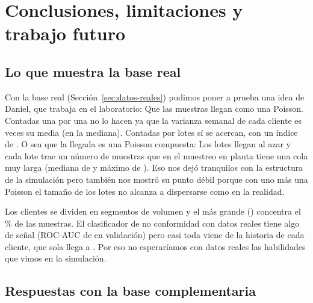 \section{Conclusiones, limitaciones y trabajo futuro}
\label{sec:conclusiones}

\ifdefined\RealMuestras
\subsection{Lo que muestra la base real}

Con la base real (Sección~\ref{sec:datos-reales}) pudimos poner a prueba
una idea de Daniel, que trabaja en el laboratorio: Que las muestras llegan
como una Poisson. Contadas una por una no lo hacen ya que la varianza
semanal de cada cliente es \RealDispMuestrasTodos{} veces su media (en la
mediana). Contadas por lotes sí se acercan, con un índice de
\RealDispLotesTodos{}. O sea que la llegada es una Poisson compuesta: Los
lotes llegan al azar y cada lote trae un número de muestras que en el
muestreo en planta tiene una cola muy larga (mediana de
\RealLoteMedianaPlanta{} y máximo de \RealLoteMaxPlanta{}). Eso nos dejó
tranquilos con la estructura de la simulación pero también nos mostró su
punto débil porque con uno más una Poisson el tamaño de los lotes no
alcanza a dispersarse como en la realidad.

Los clientes se dividen en \RealSegK{} segmentos de volumen y el más grande
(\RealSegMayor{}) concentra el \RealSegMayorMuestrasPct{}\,\% de las
muestras. El clasificador de no conformidad con datos reales tiene algo de
señal (ROC-AUC de \RealRiesgoAUCLogistica{} en validación) pero casi toda
viene de la historia de cada cliente, que sola llega a
\RealRiesgoAUCHistoria{}. Por eso no esperaríamos con datos reales las
habilidades que vimos en la simulación.
\fi

\subsection{Respuestas con la base complementaria}

